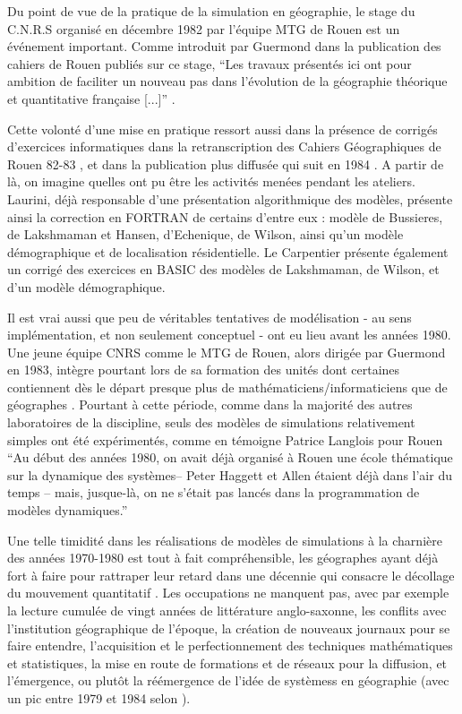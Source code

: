 Du point de vue de la pratique de la simulation en géographie, le stage du C.N.R.S organisé en décembre 1982 par l'équipe MTG de Rouen est un événement important. Comme introduit par Guermond dans la publication des cahiers de Rouen publiés sur ce stage, \enquote{Les travaux présentés ici ont pour ambition de faciliter un nouveau pas dans l'évolution de la géographie théorique et quantitative française [...]} \autocite{Guermond1983}.

Cette volonté d'une mise en pratique ressort aussi dans la présence de corrigés d'exercices informatiques dans la retranscription des Cahiers Géographiques de Rouen 82-83 \autocite{CGR1983}, et dans la publication plus diffusée qui suit en 1984 \autocite{Guermond1984}. A partir de là, on imagine quelles ont pu être les activités menées pendant les ateliers. Laurini, déjà responsable d'une présentation algorithmique des modèles, présente ainsi la correction en FORTRAN de certains d'entre eux : modèle de Bussieres, de Lakshmaman et Hansen, d'Echenique, de Wilson, ainsi qu'un modèle démographique et de localisation résidentielle. Le Carpentier présente également un corrigé des exercices en BASIC des modèles de Lakshmaman, de Wilson, et d'un modèle démographique.

Il est vrai aussi que peu de véritables tentatives de modélisation - au sens implémentation, et non seulement conceptuel - ont eu lieu avant les années 1980. Une jeune équipe CNRS comme le MTG de Rouen, alors dirigée par Guermond en 1983, intègre pourtant lors de sa formation des unités dont certaines contiennent dès le départ presque plus de mathématiciens/informaticiens que de géographes . Pourtant à cette période, comme dans la majorité des autres laboratoires de la discipline, seuls des modèles de simulations relativement simples ont été expérimentés, comme en témoigne Patrice Langlois pour Rouen \enquote{Au début des années 1980, on avait déjà organisé à Rouen une école thématique sur la dynamique des systèmes– Peter Haggett et Allen étaient déjà dans l’air du temps – mais, jusque-là, on ne s’était pas lancés dans la programmation de modèles dynamiques.} \autocite{Mathieu2014} 

Une telle timidité dans les réalisations de modèles de simulations à la charnière des années 1970-1980 est tout à fait compréhensible, les géographes ayant déjà fort à faire pour rattraper leur retard dans une décennie qui consacre le décollage du mouvement quantitatif \autocite{Cuyala2014, Orain2009}. Les occupations ne manquent pas, avec par exemple la lecture cumulée de vingt années de littérature anglo-saxonne, les conflits avec l'institution géographique de l'époque, la création de nouveaux journaux pour se faire entendre, l'acquisition et le perfectionnement des techniques mathématiques et statistiques, la mise en route de formations et de réseaux pour la diffusion, et l'émergence, ou plutôt la réémergence de l'idée de systèmess en géographie (avec un pic entre 1979 et 1984 selon \textcite{Orain2001}).

